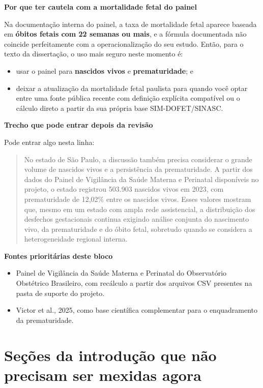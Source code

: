\documentclass[12pt,a4paper]{article}
\begin{document}
\textbf{Por que ter cautela com a mortalidade fetal do painel}

Na documentação interna do painel, a taxa de mortalidade fetal aparece baseada em \textbf{óbitos fetais com 22 semanas ou mais}, e a fórmula documentada não coincide perfeitamente com a operacionalização do seu estudo. Então, para o texto da dissertação, o uso mais seguro neste momento é:

\begin{itemize}
\item usar o painel para \textbf{nascidos vivos} e \textbf{prematuridade}; e
\item deixar a atualização da mortalidade fetal paulista para quando você optar entre uma fonte pública recente com definição explícita compatível ou o cálculo direto a partir da sua própria base SIM-DOFET/SINASC.
\end{itemize}

\textbf{Trecho que pode entrar depois da revisão}

Pode entrar algo nesta linha:

\begin{quote}
No estado de São Paulo, a discussão também precisa considerar o grande volume de nascidos vivos e a persistência da prematuridade. A partir dos dados do Painel de Vigilância da Saúde Materna e Perinatal disponíveis no projeto, o estado registrou 503.903 nascidos vivos em 2023, com prematuridade de 12,02\% entre os nascidos vivos. Esses valores mostram que, mesmo em um estado com ampla rede assistencial, a distribuição dos desfechos gestacionais continua exigindo análise conjunta do nascimento vivo, da prematuridade e do óbito fetal, sobretudo quando se considera a heterogeneidade regional interna.
\end{quote}

\textbf{Fontes prioritárias deste bloco}

\begin{itemize}
\item Painel de Vigilância da Saúde Materna e Perinatal do Observatório Obstétrico Brasileiro, com recálculo a partir dos arquivos CSV presentes na pasta de suporte do projeto.
\item Victor et al., 2025, como base científica complementar para o enquadramento da prematuridade.
\end{itemize}

\section*{Seções da introdução que não precisam ser mexidas agora}
\end{document}
